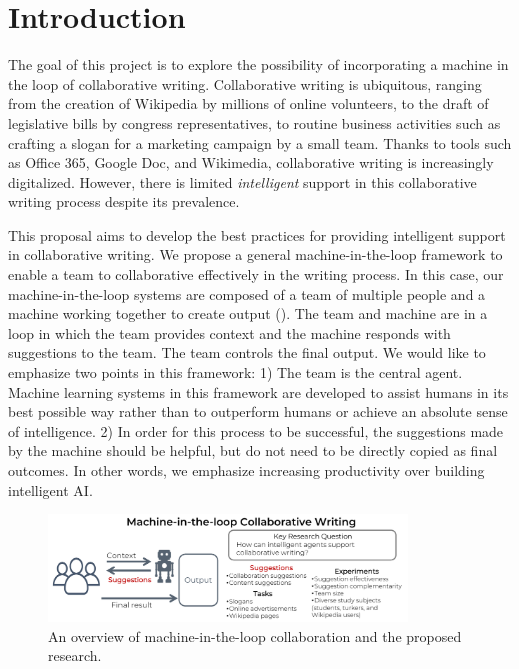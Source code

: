 
\section{Introduction}

The goal of this project is to explore the possibility of incorporating a machine in the loop of collaborative writing.
Collaborative writing is ubiquitous, ranging from the creation of Wikipedia by millions of online volunteers, to the draft of legislative bills by congress representatives, to routine business activities such as crafting a slogan for a marketing campaign by a small team.
Thanks to tools such as Office 365, Google Doc, and Wikimedia, collaborative writing is increasingly digitalized.
However, there is limited {\em intelligent} support in this collaborative writing process despite its prevalence.


This proposal aims to develop the best practices for providing intelligent support in collaborative writing.
We propose a general machine-in-the-loop framework to enable a team to collaborative effectively in the writing process.
In this case, our machine-in-the-loop systems are composed of a team of multiple people and a machine working together to create output (). The team and machine are in a loop in which the team provides context and the machine responds with suggestions to the team. The team controls the final output.
We would like to emphasize two points in this framework:
1)  The team is the central agent. Machine learning systems in this framework are developed to assist humans in its best possible way rather than to outperform humans or achieve an absolute sense of intelligence.
2)  In order for this process to be successful, the suggestions made by the machine should be helpful, but do not need to be directly copied as final outcomes.
In other words, we emphasize increasing productivity over building intelligent AI.

\begin{figure}[t]
\centering
\includegraphics[width=0.85\textwidth]{illustration.pdf}
\caption{An overview of machine-in-the-loop collaboration and the proposed research.}
\label{fig:task}
\end{figure}

